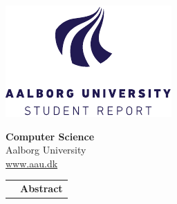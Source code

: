 \begin{minipage}{\textwidth}
\begin{minipage}[c]{0.45\textwidth}
\includegraphics[scale=1.5]{setup/firstPagesSetup/aau_logo_en.pdf}
\end{minipage}
\begin{minipage}[b]{0.45\textwidth}
\flushright
\textbf{Computer Science}\\
Aalborg University\\
\href{http://www.aau.dk}{\color{aauGray}www.aau.dk}
\end{minipage}
\end{minipage}
\vspace{1cm}
\newline

\begin{tabular}{p{} p{}}
\parbox[t]{0.45\textwidth}{}& \parbox[t]{0.45\textwidth}{{\centering  \textbf{Abstract}\bigskip\par}}
\end{tabular}
